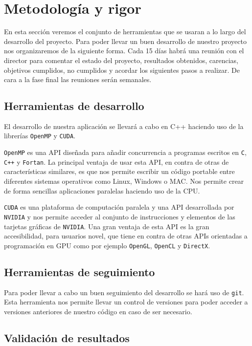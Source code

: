 \documentclass[twoside,a4paper,titlepage,11pt]{report}
\begin{document}
\section{Metodología y rigor}

En esta sección veremos el conjunto de herramientas que se usaran a lo largo del desarrollo del proyecto. Para poder llevar un buen desarrollo de nuestro proyecto nos organizaremos de la siguiente forma. Cada 15 días habrá una reunión con el director para comentar el estado del proyecto, resultados obtenidos, carencias, objetivos cumplidos, no cumplidos y acordar los siguientes pasos a realizar. De cara a la fase final las reuniones serán semanales.

\subsection{Herramientas de desarrollo}

El desarrollo de nuestra aplicación se llevará a cabo en C++ haciendo uso de la librerías \texttt{OpenMP} y \texttt{CUDA}. 

\texttt{OpenMP} es una API diseñada para añadir concurrencia a programas escritos en \texttt{C}, \texttt{C++} y \texttt{Fortan}. La principal ventaja de usar esta API, en contra de otras de características similares, es que nos permite escribir un código portable entre diferentes sistemas operativos como Linux, Windows o MAC. Nos permite crear de forma sencillas aplicaciones paralelas haciendo uso de la CPU.

\texttt{CUDA} es una plataforma de computación paralela y una API desarrollada por \texttt{NVIDIA} y nos permite acceder al conjunto de instrucciones y elementos de las tarjetas gráficas de \texttt{NVIDIA}. Una gran ventaja de esta API es la gran accesibilidad, para usuarios novel, que tiene en contra de otras APIs orientadas a programación en GPU como por ejemplo \texttt{OpenGL}, \texttt{OpenCL} y \texttt{DirectX}.

\subsection{Herramientas de seguimiento}

Para poder llevar a cabo un buen seguimiento del desarrollo se hará uso de \texttt{git}. Esta herramienta nos permite llevar un control de versiones para poder acceder a versiones anteriores de nuestro código en caso de ser necesario.

\subsection{Validación de resultados}



\newpage



\end{document}
